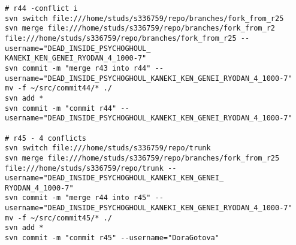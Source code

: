 \begin{verbatim}
# r44 -conflict i
svn switch file:///home/studs/s336759/repo/branches/fork_from_r25
svn merge file:///home/studs/s336759/repo/branches/fork_from_r2 file:///home/studs/s336759/repo/branches/fork_from_r25 --username="DEAD_INSIDE_PSYCHOGHOUL_
KANEKI_KEN_GENEI_RYODAN_4_1000-7"
svn commit -m "merge r43 into r44" --username="DEAD_INSIDE_PSYCHOGHOUL_KANEKI_KEN_GENEI_RYODAN_4_1000-7"
mv -f ~/src/commit44/* ./
svn add *
svn commit -m "commit r44" --username="DEAD_INSIDE_PSYCHOGHOUL_KANEKI_KEN_GENEI_RYODAN_4_1000-7"

# r45 - 4 conflicts
svn switch file:///home/studs/s336759/repo/trunk
svn merge file:///home/studs/s336759/repo/branches/fork_from_r25 file:///home/studs/s336759/repo/trunk --username="DEAD_INSIDE_PSYCHOGHOUL_KANEKI_KEN_GENEI_
RYODAN_4_1000-7"
svn commit -m "merge r44 into r45" --username="DEAD_INSIDE_PSYCHOGHOUL_KANEKI_KEN_GENEI_RYODAN_4_1000-7"
mv -f ~/src/commit45/* ./
svn add *
svn commit -m "commit r45" --username="DoraGotova"
\end{verbatim}
\normalsize
